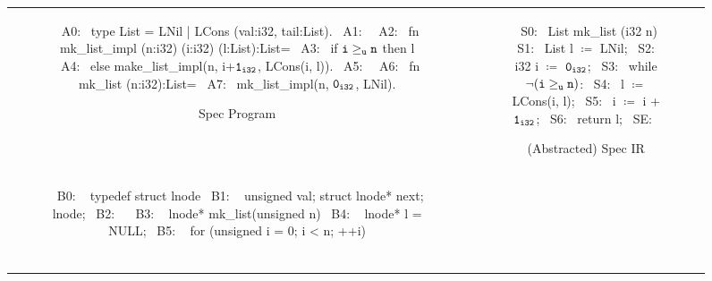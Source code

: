 \begin{figure}[H]
\begin{tabular}{cc}
\begin{subfigure}[b]{0.565\textwidth}
\begin{center}
\begin{allLangEnvScript}
~{\tiny \textcolor{mygray}{A0:}}~ type List = LNil | LCons (val:i32, tail:List).
~{\tiny \textcolor{mygray}{A1:}}~
~{\tiny \textcolor{mygray}{A2:}}~ fn mk_list_impl (n:i32) (i:i32) (l:List):List=
~{\tiny \textcolor{mygray}{A3:}}~    if ${\tt i \geq_u n}$ then l
~{\tiny \textcolor{mygray}{A4:}}~    else make_list_impl(n, i+${\tt 1_{i32}}$, LCons(i, l)).
~{\tiny \textcolor{mygray}{A5:}}~
~{\tiny \textcolor{mygray}{A6:}}~ fn mk_list (n:i32):List=
~{\tiny \textcolor{mygray}{A7:}}~    mk_list_impl(n, ${\tt 0_{i32}}$, LNil).
\end{allLangEnvScript}
\end{center}
\caption{\label{fig:llAllocSpec}Spec Program}
\end{subfigure}%
&
\begin{subfigure}[b]{0.435\textwidth}
\begin{center}
\begin{allLangEnvScript}
~{\tiny \textcolor{mygray}{S0:}}~ List mk_list (i32 n) {
~{\tiny \textcolor{mygray}{S1:}}~   List l $\coloneqq$ LNil;
~{\tiny \textcolor{mygray}{S2:}}~   i32  i $\coloneqq$ ${\tt 0_{i32}}$;
~{\tiny \textcolor{mygray}{S3:}}~   while ${\tt \neg (i \geq_{u} n)}$:
~{\tiny \textcolor{mygray}{S4:}}~     l $\coloneqq$ LCons(i, l);
~{\tiny \textcolor{mygray}{S5:}}~     i $\coloneqq$ i + ${\tt 1_{i32}}$;
~{\tiny \textcolor{mygray}{S6:}}~   return l;
~{\tiny \textcolor{mygray}{SE:}}~ }
\end{allLangEnvScript}
\end{center}
\caption{\label{fig:llAllocSpecIR}(Abstracted) Spec IR}
\end{subfigure}%
\\
\begin{subfigure}[b]{0.565\textwidth}
\begin{center}
\begin{allLangEnvScript}
~{\tiny \textcolor{mygray}{B0: }}~ typedef struct lnode {
~{\tiny \textcolor{mygray}{B1: }}~   unsigned val; struct lnode* next; } lnode;
~{\tiny \textcolor{mygray}{B2: }}~ 
~{\tiny \textcolor{mygray}{B3: }}~ lnode* mk_list(unsigned n) {
~{\tiny \textcolor{mygray}{B4: }}~   lnode* l = NULL;
~{\tiny \textcolor{mygray}{B5: }}~   for (unsigned i = 0; i < n; ++i) {                       $\phantom{\mem{} \coloneqq {\tt \mem{}[ \& (\structPointer{\tt p}{\mem{}}{lnode}{val}) \leftarrow i]_{i32}};}$
}}
\end{allLangEnvScript}
\end{center}
\end{subfigure}
\end{tabular}
\end{figure}
